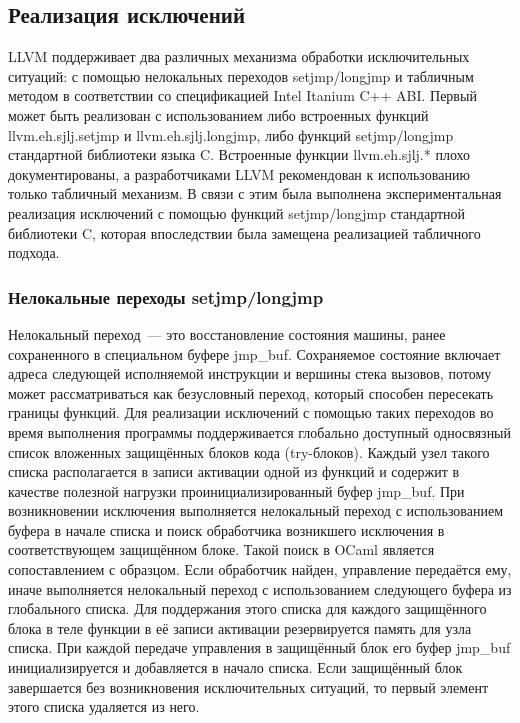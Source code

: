 \documentclass[a4paper, 12pt]{article}
\begin{document}
\subsection{Реализация исключений}
LLVM поддерживает два различных механизма обработки исключительных ситуаций: с помощью нелокальных
переходов setjmp/longjmp и табличным методом в соответствии со спецификацией Intel Itanium C++ ABI. Первый может быть
реализован с использованием либо встроенных функций llvm.eh.sjlj.setjmp и llvm.eh.sjlj.longjmp, либо функций
setjmp/longjmp стандартной библиотеки языка C. Встроенные функции llvm.eh.sjlj.* плохо документированы, а разработчиками
LLVM рекомендован к использованию только табличный механизм. В связи с этим была выполнена экспериментальная реализация
исключений с помощью функций setjmp/longjmp стандартной библиотеки C, которая впоследствии была замещена реализацией
табличного подхода.

\subsubsection{Нелокальные переходы setjmp/longjmp}
\label{subsubsec:setjmp}
Нелокальный переход~--- это восстановление состояния машины, ранее сохраненного в специальном буфере jmp\_buf.
Сохраняемое состояние включает адреса следующей исполняемой инструкции и вершины стека вызовов, потому может
рассматриваться как безусловный переход, который способен пересекать границы функций. Для реализации исключений с
помощью таких переходов во время выполнения программы поддерживается глобально доступный односвязный список вложенных
защищённых блоков кода (try-блоков). Каждый узел такого списка располагается в записи активации одной из функций и
содержит в качестве полезной нагрузки проинициализированный буфер jmp\_buf. При возникновении исключения выполняется
нелокальный переход с использованием буфера в начале списка и поиск обработчика возникшего исключения в соответствующем
защищённом блоке. Такой поиск в OCaml является сопоставлением с образцом. Если обработчик найден, управление
передаётся ему, иначе выполняется нелокальный переход с использованием следующего буфера из глобального списка. Для
поддержания этого списка для каждого защищённого блока в теле функции в её записи активации резервируется память для
узла списка. При каждой передаче управления в защищённый блок его буфер jmp\_buf инициализируется и добавляется в начало
списка. Если защищённый блок завершается без возникновения исключительных ситуаций, то первый элемент этого списка
удаляется из него.
\end{document}
